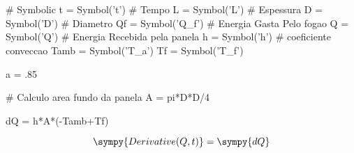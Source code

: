 \documentclass[a4paper,11pt]{article}
\title{\tituloRelatorio}
\author{Rafael Lima}
\begin{document}

\section{}

\begin{sympycode}

# Symbolic
t = Symbol('t') # Tempo
L = Symbol('L') # Espessura
D = Symbol('D') # Diametro
Qf = Symbol('Q_f') # Energia Gasta Pelo fogao
Q = Symbol('Q') # Energia Recebida pela panela
h = Symbol('h') # coeficiente conveccao
Tamb = Symbol('T_a')
Tf = Symbol('T_f')


a = .85

# Calculo area fundo da panela
A = pi*D*D/4

dQ = h*A*(-Tamb+Tf)
\end{sympycode}

\begin{equation}
 \sympy{Derivative(Q,t)} = \sympy{dQ}
\end{equation}






\end{document}
